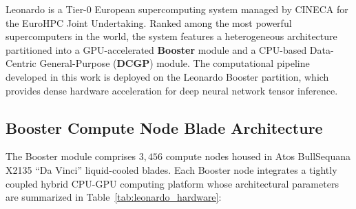 Leonardo is a Tier-0 European supercomputing system managed by CINECA for the EuroHPC Joint Undertaking. Ranked among the most powerful supercomputers in the world, the system features a heterogeneous architecture partitioned into a GPU-accelerated \textbf{Booster} module and a CPU-based Data-Centric General-Purpose (\textbf{DCGP}) module. The computational pipeline developed in this work is deployed on the Leonardo Booster partition, which provides dense hardware acceleration for deep neural network tensor inference.

\subsection{Booster Compute Node Blade Architecture}
The Booster module comprises $3{,}456$ compute nodes housed in Atos BullSequana X2135 ``Da Vinci'' liquid-cooled blades. Each Booster node integrates a tightly coupled hybrid CPU-GPU computing platform whose architectural parameters are summarized in Table~\ref{tab:leonardo_hardware}:


